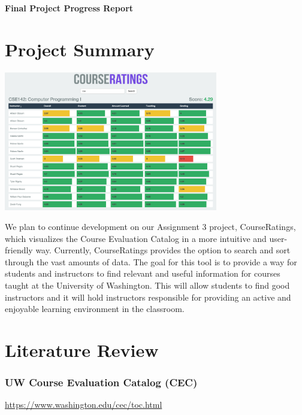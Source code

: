\documentclass{article}
\date{}
\begin{document}
\begin{center}
\LARGE
\textbf{Final Project Progress Report}
\end{center}
\vspace{-15 pt}
\section*{Project Summary}

\vspace{-3 pt}
\begin{center}
\includegraphics[width=0.7\textwidth]{cr.png}
\end{center}

We plan to continue development on our Assignment 3 project, CourseRatings, which visualizes the Course Evaluation Catalog in a more intuitive and user-friendly way. Currently, CourseRatings provides the option to search and sort through the vast amounts of data. The goal for this tool is to provide a way for students and instructors to find relevant and useful information for courses taught at the University of Washington. This will allow students to find good instructors and it will hold instructors responsible for providing an active and enjoyable learning environment in the classroom.
\vspace{-10 pt}
\section*{Literature Review}

\subsubsection*{UW Course Evaluation Catalog (CEC) \cite{cec}}
{\color{blue} \href{https://www.washington.edu/cec/toc.html}{https://www.washington.edu/cec/toc.html}}
\end{document}

